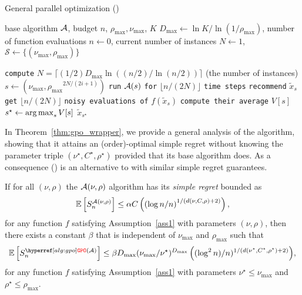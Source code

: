 \begin{algorithm}[ht]
\centering
\caption{General parallel optimization (\GPO)}
\label{alg:gpo}
\begin{algorithmic}[1]
     base algorithm $\mathcal{A}$, budget $n$, $\rho_{\max}, \nu_{\max}$, $K$
     $D_{\max} \gets \ln K/\ln\left( 1/\rho_{\max}\right)$, number of function evaluations $n \gets 0$, current number of \HCT instances $N \gets 1$, $\mathcal{S} \gets \{(\nu_{\max},\rho_{\max})\}$

    \State \texttt{compute} $N = \lceil (1/2)D_{\max}\ln((n/2)/\ln(n/2))\rceil$ (the number of instances)
    	\State $s \gets \left(\nu_{\max},{\rho_{\max}}^{2N/(2i+1)}\right)$
		\State \texttt{run} $\mathcal{A}(s)$ \texttt{for} $\lfloor n/(2N)\rfloor$ \texttt{time steps}
		\State \texttt{recommend} $\tilde x_s$
		\State \texttt{get} $\lfloor n/(2N)\rfloor$ \texttt{noisy evaluations of} $f(\tilde{x}_s)$
		\State \texttt{compute their average} $V[s]$
	\EndFor
    \State ${s^\star} \gets \operatorname*{arg\,max}_{s} V[s]$
     $\tilde x_{s^\star}$
\end{algorithmic}
\end{algorithm}

In Theorem~\ref{thm:gpo_wrapper}, we provide a general analysis of the \GPO algorithm, showing that it attains an (order)-optimal simple regret without knowing the parameter triple $(\nu^\star,C^\star,\rho^\star)$ provided that its base algorithm does. As a consequence \GPO{}(\HCT) is an alternative to \PCT with similar simple regret guarantees.

\begin{theorem}\label{thm:gpo_wrapper}
If for all $(\nu,\rho)$ the $\mathcal{A}(\nu,\rho)$ algorithm has its \emph{simple regret} bounded as
\begin{equation}\label{crucialHypothesis}
    \mathbb{E}\left[S_n^{\mathcal{A}(\nu,\rho)}\right] \leq \alpha C\left(\left(\log n /n\right)^{1/(d(\nu,C,\rho)+2)}\right),
\end{equation}
for any function $f$ satisfying Assumption~\ref{ass1} with parameters $(\nu,\rho)$, then there exists a constant $\beta$ that is independent of $\nu_{\max}$ and $\rho_{\max}$ such that 
\[
    \mathbb{E}\left[S_n^{\GPO(\cA)}\right]  \leq \beta D_{\max}(\nu_{\max}/\nu^\star)^{D_{\max}} \left( (\log^2 n)/n)^{1/(d(\nu^\star,C^\star,\rho^\star)+2)} \right)\!,
\]
for any function $f$ satisfying Assumption~\ref{ass1} with parameters $\nu^\star \leq \nu_{\max}$ and $\rho^\star\leq \rho_{\max}$.
\end{theorem}

